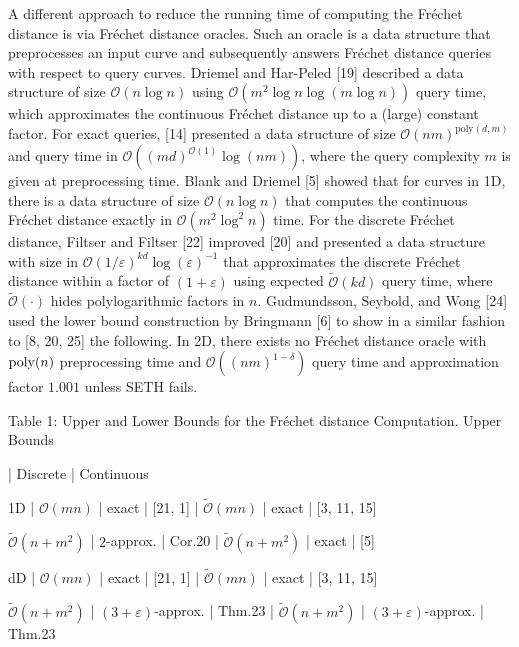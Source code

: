 \documentclass[10pt,a4paper]{article}
\begin{document}
A different approach to reduce the running time of computing the Fréchet distance is via Fréchet distance oracles. Such an oracle is a data structure that preprocesses an input curve and subsequently answers Fréchet distance queries with respect to query curves. Driemel and Har-Peled [19] described a data structure of size $\mathcal{O}(n\log n)$ using $\mathcal{O}(m^{2}\log n\log(m\log n))$ query time, which approximates the continuous Fréchet distance up to a (large) constant factor. For exact queries, [14] presented a data structure of size $\mathcal{O}(nm)^{\text{poly}(d,m)}$ and query time in $\mathcal{O}((md)^{\mathcal{O}(1)}\log(nm))$, where the query complexity $m$ is given at preprocessing time. Blank and Driemel [5] showed that for curves in 1D, there is a data structure of size $\mathcal{O}(n\log n)$ that computes the continuous Fréchet distance exactly in $\mathcal{O}(m^{2}\log^{2}n)$ time. For the discrete Fréchet distance, Filtser and Filtser [22] improved [20] and presented a data structure with size in $\mathcal{O}(1/\varepsilon)^{kd}\log(\varepsilon)^{-1}$ that approximates the discrete Fréchet distance within a factor of $(1+\varepsilon)$ using expected $\widetilde{\mathcal{O}}(kd)$ query time, where $\widetilde{\mathcal{O}}(\cdot)$ hides polylogarithmic factors in $n$. Gudmundsson, Seybold, and Wong [24] used the lower bound construction by Bringmann [6] to show in a similar fashion to [8, 20, 25] the following. In 2D, there exists no Fréchet distance oracle with $\textup{poly}(n)$ preprocessing time and $\mathcal{O}((nm)^{1-\delta})$ query time and approximation factor $1.001$ unless SETH fails.
\par
\par
 Table 1: Upper and Lower Bounds for the Fréchet distance Computation. 
\noindent Upper Bounds\par
\noindent  | Discrete | Continuous\par
\noindent 1D | ${\mathcal{O}}(mn)$ | exact | [21, 1] | $\widetilde{\mathcal{O}}(mn)$ | exact | [3, 11, 15]\par
\noindent $\widetilde{\mathcal{O}}(n+m^{2})$ |  $2$-approx. | Cor.20  | $\widetilde{\mathcal{O}}(n+m^{2})$ | exact | [5]\par
\noindent dD | ${\mathcal{O}}(mn)$ | exact | [21, 1] | $\widetilde{\mathcal{O}}(mn)$ | exact | [3, 11, 15]\par
\noindent $\widetilde{\mathcal{O}}(n+m^{2})$ |  $(3+\varepsilon)$-approx. | Thm.23  | $\widetilde{\mathcal{O}}(n+m^{2})$ |  $(3+\varepsilon)$-approx. | Thm.23 \par
\end{document}
